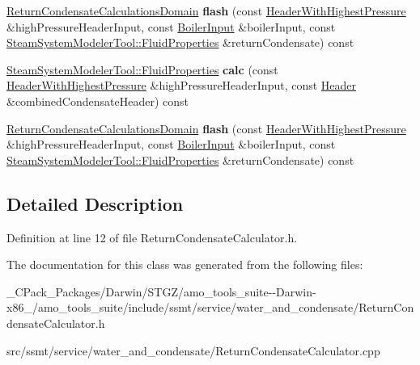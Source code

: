 \begin{DoxyCompactItemize}
\hyperlink{class_return_condensate_calculations_domain}{Return\+Condensate\+Calculations\+Domain} {\bfseries flash} (const \hyperlink{class_header_with_highest_pressure}{Header\+With\+Highest\+Pressure} \&high\+Pressure\+Header\+Input, const \hyperlink{class_boiler_input}{Boiler\+Input} \&boiler\+Input, const \hyperlink{struct_steam_system_modeler_tool_1_1_fluid_properties}{Steam\+System\+Modeler\+Tool\+::\+Fluid\+Properties} \&return\+Condensate) const
\item 
\mbox{\label{class_return_condensate_calculator_a091b6d5fd24ffe00835cdf590024545d}} 
\hyperlink{struct_steam_system_modeler_tool_1_1_fluid_properties}{Steam\+System\+Modeler\+Tool\+::\+Fluid\+Properties} {\bfseries calc} (const \hyperlink{class_header_with_highest_pressure}{Header\+With\+Highest\+Pressure} \&high\+Pressure\+Header\+Input, const \hyperlink{class_header}{Header} \&combined\+Condensate\+Header) const
\item 
\mbox{\label{class_return_condensate_calculator_a60e044367cfec76fb4c18a998f65a9a5}} 
\hyperlink{class_return_condensate_calculations_domain}{Return\+Condensate\+Calculations\+Domain} {\bfseries flash} (const \hyperlink{class_header_with_highest_pressure}{Header\+With\+Highest\+Pressure} \&high\+Pressure\+Header\+Input, const \hyperlink{class_boiler_input}{Boiler\+Input} \&boiler\+Input, const \hyperlink{struct_steam_system_modeler_tool_1_1_fluid_properties}{Steam\+System\+Modeler\+Tool\+::\+Fluid\+Properties} \&return\+Condensate) const
\end{DoxyCompactItemize}


\subsection{Detailed Description}


Definition at line 12 of file Return\+Condensate\+Calculator.\+h.



The documentation for this class was generated from the following files\+:\begin{DoxyCompactItemize}
\item 
\+\_\+\+C\+Pack\+\_\+\+Packages/\+Darwin/\+S\+T\+G\+Z/amo\+\_\+tools\+\_\+suite-\/-\/\+Darwin-\/x86\+\_/amo\+\_\+tools\+\_\+suite/include/ssmt/service/water\+\_\+and\+\_\+condensate/Return\+Condensate\+Calculator.\+h\item 
src/ssmt/service/water\+\_\+and\+\_\+condensate/Return\+Condensate\+Calculator.\+cpp\end{DoxyCompactItemize}
